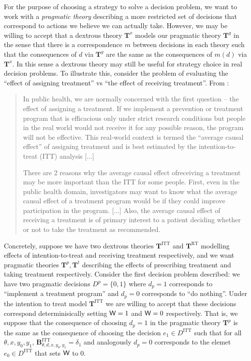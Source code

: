 For the purpose of choosing a strategy to solve a decision problem, we want to work with a \emph{pragmatic theory} describing a more restricted set of decisions that correspond to actions we believe we can actually take. However, we may be willing to accept that a dextrous theory $\mathbf{T}^x$ models our pragmatic theory $\mathbf{T}^g$ in the sense that there is a correspondence $m$ between decisions in each theory such that the consequences of $d$ via $\mathbf{T}^g$ are the same as the consequences of $m(d)$ via $\mathbf{T}^x$. In this sense a dextrous theory may still be useful for strategy choice in real decision problems. To illustrate this, consider the problem of evaluating the ``effect of assigning treatment'' vs ``the effect of receiving treatment''. From \citet{shrier_intention--treat_2017}:

\begin{quote}
In public health, we are normally concerned with the first question -- the effect of assigning a treatment. If we implement a prevention or treatment program that is efficacious only under strict research conditions but people in the real world would not receive it for any possible reason, the program will not be effective. This real-world context is termed the “average causal effect” of assigning treatment and is best estimated by the intention-to-treat (ITT) analysis [...]

There are 2 reasons why the average causal effect ofreceiving a treatment may be more important than the ITT for some people. First, even in the public health domain, investigators may want to know what the average causal effect of a treatment program would be if they could improve participation in the program. [...] Also, the average causal effect of receiving a treatment is of primary interest to a patient deciding whether or not to take the treatment as recommended.
\end{quote}

Concretely, suppose we have two dextrous theories $\mathbf{T}^{\mathrm{ITT}}$ and $\mathbf{T}^{\mathrm{RT}}$ modelling effects of intention-to-treat and receiving treatment respectively, and we want pragmatic theories $\mathbf{T}^p,\mathbf{T}^t$ describing the effects of prescribing treatment and taking treatment respectively. Consider the first decision problem described: we have two pragmatic decisions $D^p=\{0,1\}$ where $d_p=1$ corresponds to ``implement a treatment program'' and $d_p=0$ corresponds to ``do nothing''. Under the intention to treat model $\mathbf{T}^{\mathrm{ITT}}$ we are willing to accept that these decisions correspond determinisically setting $\mathsf{W}=1$ and $\mathsf{W}=0$ respectively. That is, we suppose that the consequence of choosing $d_p=1$ in the pragmatic theory $\mathbf{T}^p$ is the same as the consequence of choosing the decision $e_1\in D^{\mathrm{ITT}}$ such that for all $\theta,x,y_0,y_1$, $\mathbf{B}^{\mathrm{ITT}}_{\theta,d,x,y_0,y_1} = \delta_1$ and analogously $d_p=0$ corresponds to the elemet $e_0\in D^{\mathrm{ITT}}$ that sets $\mathsf{W}$ to 0.

